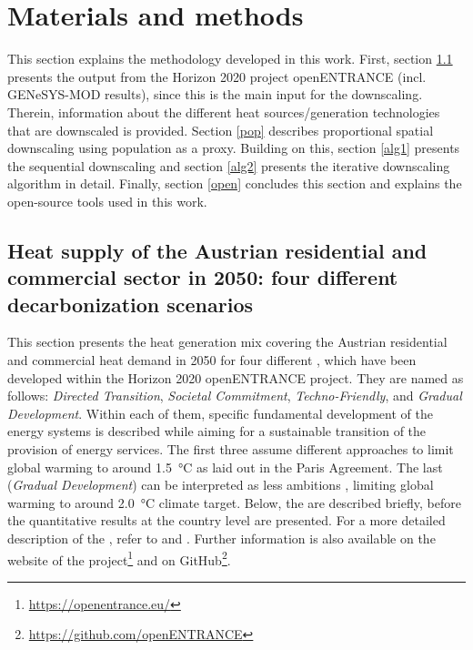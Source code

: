 \section{Materials and methods}\label{methodology}
This section explains the methodology developed in this work. First, section \ref{res:1} presents the output from the Horizon 2020 project openENTRANCE (incl. GENeSYS-MOD results), since this is the main input for the downscaling. Therein, information about the different heat sources/generation technologies that are downscaled is provided.  Section \ref{pop} describes proportional spatial downscaling using population as a proxy. Building on this, section \ref{alg1} presents the sequential downscaling and section \ref{alg2} presents the iterative downscaling algorithm in detail.  Finally, section \ref{open} concludes this section and explains the open-source tools used in this work.

\subsection{Heat supply of the Austrian residential and commercial sector in 2050: four different decarbonization scenarios}\label{res:1}
This section presents the heat generation mix covering the Austrian residential and commercial heat demand in 2050 for four different , which have been developed within the Horizon 2020 openENTRANCE project. They are named as follows: \textit{Directed Transition}, \textit{Societal Commitment}, \textit{Techno-Friendly}, and \textit{Gradual Development}. Within each of them, specific fundamental development of the energy systems is described while aiming for a sustainable transition of the provision of energy services. The first three  assume different approaches to limit global warming to around \SI{1.5}{\degreeCelsius} as laid out in the Paris Agreement.  The last  (\textit{Gradual Development}) can be interpreted as less ambitions , limiting global warming to around \SI{2.0}{\degreeCelsius} climate target.  Below, the  are described briefly, before the quantitative results at the country level are presented. For a more detailed description of the , refer to \cite{auer2020quantitative} and \cite{auer2020development}. Further information is also available on the website of the project\footnote{\url{https://openentrance.eu/}} and on GitHub\footnote{\url{https://github.com/openENTRANCE}}.\vspace{0.3cm}

